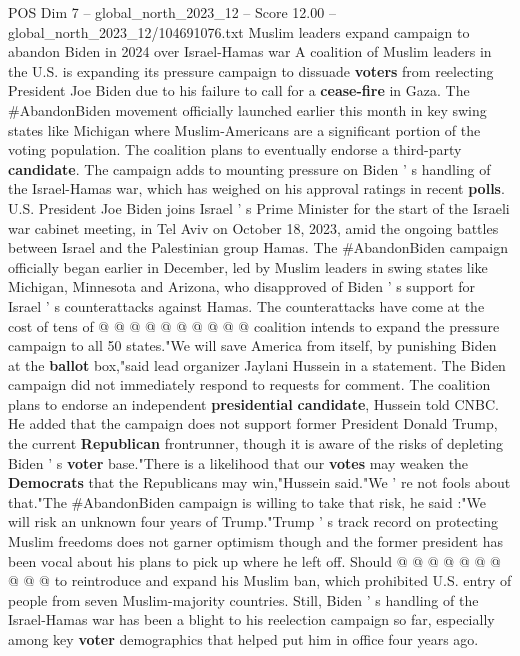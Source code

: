 \begin{textsample}{POS Dim 7 – global\_north\_2023\_12 – Score 12.00 – global\_north\_2023\_12/104691076.txt}  \label{ex:f7_pos_147}
Muslim leaders expand campaign to abandon Biden in 2024 over Israel-Hamas war A coalition of Muslim leaders in the U.S. is expanding its pressure campaign to dissuade \textbf{voters} from reelecting President Joe Biden due to his failure to call for a \textbf{cease-fire} in Gaza.
The \#AbandonBiden movement officially launched earlier this month in key swing states like Michigan where Muslim-Americans are a significant portion of the voting population.
The coalition plans to eventually endorse a third-party \textbf{candidate}.
The campaign adds to mounting pressure on Biden ' s handling of the Israel-Hamas war, which has weighed on his approval ratings in recent \textbf{polls}.
U.S.
President Joe Biden joins Israel ' s Prime Minister for the start of the Israeli war cabinet meeting, in Tel Aviv on October 18, 2023, amid the ongoing battles between Israel and the Palestinian group Hamas.
The \#AbandonBiden campaign officially began earlier in December, led by Muslim leaders in swing states like Michigan, Minnesota and Arizona, who disapproved of Biden ' s support for Israel ' s counterattacks against Hamas.
The counterattacks have come at the cost of tens of @ @ @ @ @ @ @ @ @ @ coalition intends to expand the pressure campaign to all 50 states."We will save America from itself, by punishing Biden at the \textbf{ballot} box,"said lead organizer Jaylani Hussein in a statement.
The Biden campaign did not immediately respond to requests for comment.
The coalition plans to endorse an independent \textbf{presidential} \textbf{candidate}, Hussein told CNBC.
He added that the campaign does not support former President Donald Trump, the current \textbf{Republican} frontrunner, though it is aware of the risks of depleting Biden ' s \textbf{voter} base."There is a likelihood that our \textbf{votes} may weaken the \textbf{Democrats} that the Republicans may win,"Hussein said."We ' re not fools about that."The \#AbandonBiden campaign is willing to take that risk, he said :"We will risk an unknown four years of Trump."Trump ' s track record on protecting Muslim freedoms does not garner optimism though and the former president has been vocal about his plans to pick up where he left off.
Should @ @ @ @ @ @ @ @ @ @ to reintroduce and expand his Muslim ban, which prohibited U.S. entry of people from seven Muslim-majority countries.
Still, Biden ' s handling of the Israel-Hamas war has been a blight to his reelection campaign so far, especially among key \textbf{voter} demographics that helped put him in office four years ago.

\end{textsample}
